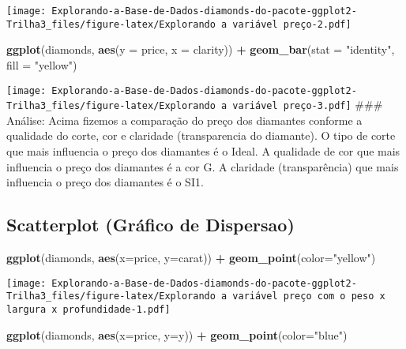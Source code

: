 \documentclass[
]{article}
\newenvironment{Shaded}{\begin{snugshade}}{\end{snugshade}}
\newcommand{\DataTypeTok}[1]{\textcolor[rgb]{0.13,0.29,0.53}{#1}}
\newcommand{\KeywordTok}[1]{\textcolor[rgb]{0.13,0.29,0.53}{\textbf{#1}}}
\newcommand{\NormalTok}[1]{#1}
\newcommand{\OperatorTok}[1]{\textcolor[rgb]{0.81,0.36,0.00}{\textbf{#1}}}
\newcommand{\StringTok}[1]{\textcolor[rgb]{0.31,0.60,0.02}{#1}}
\begin{document}
\texttt{[image: Explorando-a-Base-de-Dados-diamonds-do-pacote-ggplot2-Trilha3\_files/figure-latex/Explorando a variável preço-2.pdf]}

\begin{Shaded}
\begin{Highlighting}[]
\KeywordTok{ggplot}\NormalTok{(diamonds, }\KeywordTok{aes}\NormalTok{(}\DataTypeTok{y =}\NormalTok{ price, }\DataTypeTok{x =}\NormalTok{ clarity)) }\OperatorTok{+}\StringTok{ }\KeywordTok{geom_bar}\NormalTok{(}\DataTypeTok{stat =} \StringTok{"identity"}\NormalTok{, }\DataTypeTok{fill =} \StringTok{"yellow"}\NormalTok{)}
\end{Highlighting}
\end{Shaded}

\texttt{[image: Explorando-a-Base-de-Dados-diamonds-do-pacote-ggplot2-Trilha3\_files/figure-latex/Explorando a variável preço-3.pdf]}
\#\#\# Análise: Acima fizemos a comparação do preço dos diamantes
conforme a qualidade do corte, cor e claridade (transparencia do
diamante). O tipo de corte que mais influencia o preço dos diamantes é o
Ideal. A qualidade de cor que mais influencia o preço dos diamantes é a
cor G. A claridade (transparência) que mais influencia o preço dos
diamantes é o SI1.

\hypertarget{scatterplot-gruxe1fico-de-dispersao}{%
\subsection{Scatterplot (Gráfico de
Dispersao)}\label{scatterplot-gruxe1fico-de-dispersao}}

\begin{Shaded}
\begin{Highlighting}[]
\KeywordTok{ggplot}\NormalTok{(diamonds, }\KeywordTok{aes}\NormalTok{(}\DataTypeTok{x=}\NormalTok{price, }\DataTypeTok{y=}\NormalTok{carat)) }\OperatorTok{+}\StringTok{ }\KeywordTok{geom_point}\NormalTok{(}\DataTypeTok{color=}\StringTok{"yellow"}\NormalTok{)}
\end{Highlighting}
\end{Shaded}

\texttt{[image: Explorando-a-Base-de-Dados-diamonds-do-pacote-ggplot2-Trilha3\_files/figure-latex/Explorando a variável preço com o peso x largura x profundidade-1.pdf]}

\begin{Shaded}
\begin{Highlighting}[]
\KeywordTok{ggplot}\NormalTok{(diamonds, }\KeywordTok{aes}\NormalTok{(}\DataTypeTok{x=}\NormalTok{price, }\DataTypeTok{y=}\NormalTok{y)) }\OperatorTok{+}\StringTok{ }\KeywordTok{geom_point}\NormalTok{(}\DataTypeTok{color=}\StringTok{"blue"}\NormalTok{)}
\end{Highlighting}
\end{Shaded}
\end{document}
